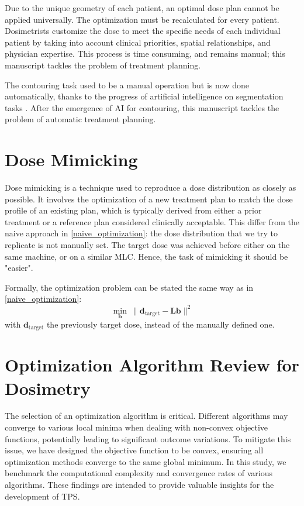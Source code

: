 Due to the unique geometry of each patient, an optimal dose plan cannot be applied universally.
The optimization must be recalculated for every patient.
Dosimetrists customize the dose to meet the specific needs of each individual patient by taking into account clinical priorities, spatial relationships, and physician expertise.
This process is time consuming, and remains manual; this manuscript tackles the problem of treatment planning.

The contouring task used to be a manual operation but is now done automatically, thanks to the progress of artificial intelligence on segmentation tasks \cite{Kim2024} \cite{Duan2022}.
After the emergence of AI for contouring, this manuscript tackles the problem of automatic treatment planning.

\section{Dose Mimicking}
Dose mimicking is a technique used to reproduce a dose distribution as closely as possible.
It involves the optimization of a new treatment plan to match the dose profile of an existing plan, which is typically derived from either a prior treatment or a reference plan considered clinically acceptable.
This differ from the naive approach in \ref{naive_optimization}: the dose distribution that we try to replicate is not manually set.
The target dose was achieved before either on the same machine, or on a similar MLC.
Hence, the task of mimicking it should be "easier".

Formally, the optimization problem can be stated the same way as in \ref{naive_optimization}:
$$ \min_\mathbf{b} \ \| \mathbf{d}_{\text{target}} - \textbf{L}\mathbf{b} \|^2 $$
with $\mathbf{d}_{\text{target}}$ the previously target dose, instead of the manually defined one.

\section{Optimization Algorithm Review for Dosimetry}
The selection of an optimization algorithm is critical.
Different algorithms may converge to various local minima when dealing with non-convex objective functions, potentially leading to significant outcome variations.
To mitigate this issue, we have designed the objective function to be convex, ensuring all optimization methods converge to the same global minimum.
In this study, we benchmark the computational complexity and convergence rates of various algorithms.
These findings are intended to provide valuable insights for the development of TPS.

